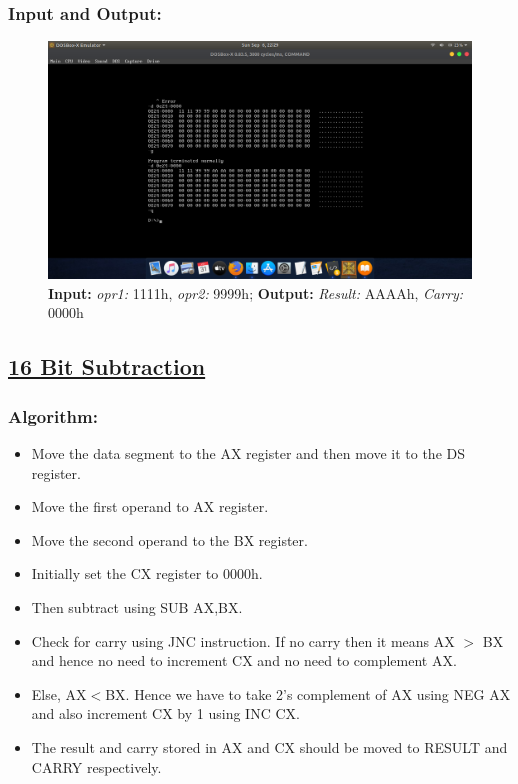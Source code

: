 \documentclass[12pt,a4paper]{article}
\begin{document}
\begin{flushleft}
\subsubsection*{\textbf{Input and Output:}}
\begin{figure}[h]
    \centering
    \includegraphics[trim = 100mm 75mm 100mm 70mm, clip, width = \textwidth]{AdditionIO.png}
    \caption{ \textbf{Input:} \emph{opr1:} 1111h, \emph{opr2:} 9999h; 
              \textbf{Output:} \emph{Result:} AAAAh, \emph{Carry:} 0000h}
\end{figure}
\newpage
\subsection*{\textbf{\underline{16 Bit Subtraction}}}

\subsubsection*{\textbf{Algorithm:}}
\begin{itemize}
    \item Move the data segment to the AX register and then move it to the DS register.
    \item Move the first operand to AX register. 
    \item Move the second operand to the BX register. 
    \item Initially set the CX register to 0000h. 
    \item Then subtract using SUB AX,BX.
    \item Check for carry using JNC instruction. If no carry then it means AX $>$ BX and hence no need to increment CX and no need to complement AX.
\item Else, AX$<$BX. Hence we have to take 2’s complement of AX using NEG AX and also increment CX by 1 using INC CX.
\item The result and carry stored in AX and CX should be moved to RESULT and CARRY respectively.
\end{itemize}


\end{flushleft}
\end{document}
